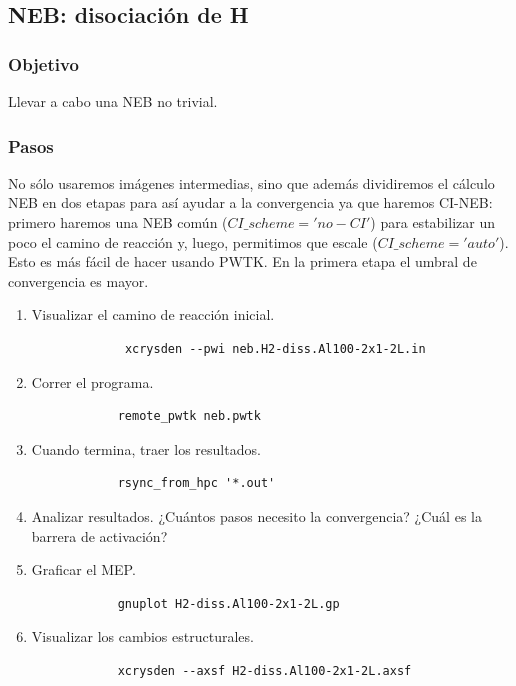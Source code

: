 \subsection{NEB: disociación de H}

\subsubsection{Objetivo}

   Llevar a cabo una NEB no trivial.

\subsubsection{Pasos}

  No sólo usaremos imágenes intermedias, sino que además dividiremos el cálculo NEB en dos etapas para así ayudar a la convergencia ya que haremos CI-NEB: primero haremos una NEB común ($CI\_scheme = 'no-CI'$) para estabilizar un poco el camino de reacción y, luego, permitimos que escale ($CI\_scheme = 'auto'$). Esto es más fácil de hacer usando PWTK. En la primera etapa el umbral de convergencia es mayor.

       \begin{enumerate}
         \item Visualizar el camino de reacción inicial.
           \begin{verbatim}
             xcrysden --pwi neb.H2-diss.Al100-2x1-2L.in
           \end{verbatim}
          \item Correr el programa.
          \begin{verbatim}
            remote_pwtk neb.pwtk
          \end{verbatim}
          \item Cuando termina, traer los resultados.
          \begin{verbatim}
            rsync_from_hpc '*.out'
          \end{verbatim}
          \item Analizar resultados. ¿Cuántos pasos necesito la convergencia? ¿Cuál es la barrera de activación?
          \item Graficar el MEP.
          \begin{verbatim}
            gnuplot H2-diss.Al100-2x1-2L.gp
          \end{verbatim}
          \item Visualizar los cambios estructurales.
          \begin{verbatim}
            xcrysden --axsf H2-diss.Al100-2x1-2L.axsf
          \end{verbatim}
       \end{enumerate}

